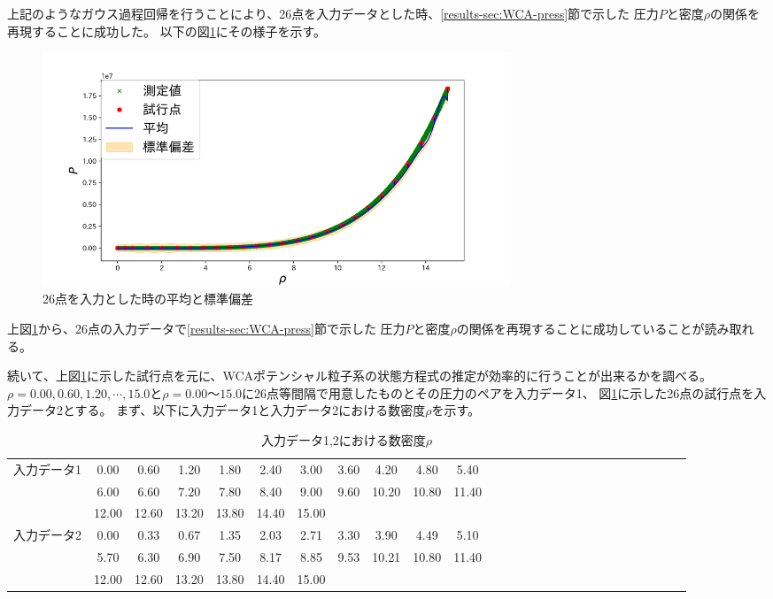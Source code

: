 \documentclass[titlepage]{jsreport}
\begin{document}
{{{上記のようなガウス過程回帰を行うことにより、26点を入力データとした時、\ref{results-sec:WCA-press}節で示した
圧力$P$と密度$\rho$の関係を再現することに成功した。
以下の図\ref{fig:26plot}にその様子を示す。

\begin{figure}[htbp]
    \begin{center}
        \includegraphics[width=14cm]{fig/26plot-Gauss.png}
    \end{center}
    \caption{26点を入力とした時の平均と標準偏差}
    \label{fig:26plot}
\end{figure}

上図\ref{fig:26plot}から、26点の入力データで\ref{results-sec:WCA-press}節で示した
圧力$P$と密度$\rho$の関係を再現することに成功していることが読み取れる。

続いて、上図\ref{fig:26plot}に示した試行点を元に、WCAポテンシャル粒子系の状態方程式の推定が効率的に行うことが出来るかを調べる。
$\rho=0.00,0.60,1.20,\cdots,15.0$と$\rho=0.00〜15.0$に26点等間隔で用意したものとその圧力のペアを入力データ1、
図\ref{fig:26plot}に示した26点の試行点を入力データ2とする。
まず、以下に入力データ1と入力データ2における数密度$\rho$を示す。

\newpage
\begin{table}[htbp]
    \begin{center}
        \caption{入力データ1,2における数密度$\rho$}
        \label{table:compare-Gauss}
            \begin{tabular}{c||c c c c c c c c c c c c c c c c c c c c c c c c c c}
               
                    入力データ1& 0.00&0.60&1.20&1.80&2.40&3.00&3.60&4.20&4.80&5.40\\
                    &6.00&6.60&7.20&7.80&8.40&9.00&9.60&10.20&10.80&11.40\\
                    &12.00&12.60&13.20&13.80&14.40&15.00\\ \hline
                    入力データ2& 0.00&0.33&0.67&1.35&2.03&2.71&3.30&3.90&4.49&5.10\\
                    &5.70&6.30&6.90&7.50&8.17&8.85&9.53&10.21&10.80&11.40\\
                    &12.00&12.60&13.20&13.80&14.40&15.00
            \end{tabular}
    \end{center}
    

\end{table}}}}
\end{document}
